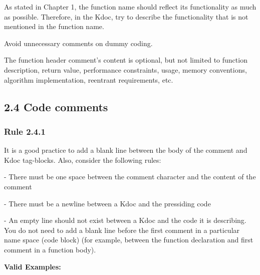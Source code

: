 As stated in Chapter 1, the function name should reflect its functionality as much as possible. Therefore, in the Kdoc, try to describe the functionality that is not mentioned in the function name.

Avoid unnecessary comments on dummy coding.



The function header comment's content is optional, but not limited to function description, return value, performance constraints, usage, memory conventions, algorithm implementation, reentrant requirements, etc.



\subsection*{\textbf{2.4 Code comments}}

\subsubsection*{\textbf{Rule 2.4.1}}
\leavevmode\newline

It is a good practice to add a blank line between the body of the comment and Kdoc tag-blocks. Also, consider the following rules:

- There must be one space between the comment character and the content of the comment

- There must be a newline between a Kdoc and the pressiding code

- An empty line should not exist between a Kdoc and the code it is describing. You do not need to add a blank line before the first comment in a particular name space (code block) (for example, between the function declaration and first comment in a function body).



\textbf{Valid Examples:}

